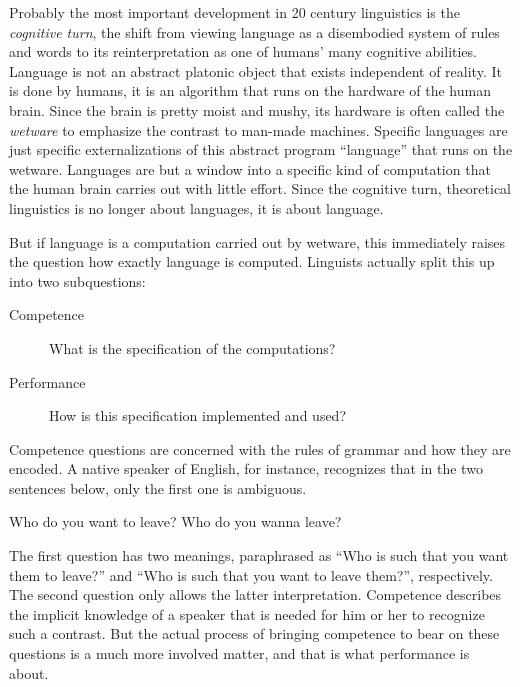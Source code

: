 Probably the most important development in 20 century linguistics is the \emph{cognitive turn}, the shift from viewing language as a disembodied system of rules and words to its reinterpretation as one of humans' many cognitive abilities.
Language is not an abstract platonic object that exists independent of reality.
It is done by humans, it is an algorithm that runs on the hardware of the human brain.
Since the brain is pretty moist and mushy, its hardware is often called the \emph{wetware} to emphasize the contrast to man-made machines.
Specific languages are just specific externalizations of this abstract program ``language'' that runs on the wetware.
Languages are but a window into a specific kind of computation that the human brain carries out with little effort.
Since the cognitive turn, theoretical linguistics is no longer about languages, it is about language.

But if language is a computation carried out by wetware, this immediately raises the question how exactly language is computed.
Linguists actually split this up into two subquestions:
%
\begin{description}
    \item[Competence]
        What is the specification of the computations?
    \item[Performance]
        How is this specification implemented and used?
\end{description}
%
Competence questions are concerned with the rules of grammar and how they are encoded.
A native speaker of English, for instance, recognizes that in the two sentences below, only the first one is ambiguous.
%
\begin{exe}
    \ex
    \begin{xlist}
        \ex Who do you want to leave?
        \ex Who do you wanna leave?
    \end{xlist}
\end{exe}
%
The first question has two meanings, paraphrased as ``Who is such that you want them to leave?'' and ``Who is such that you want to leave them?'', respectively.
The second question only allows the latter interpretation.
Competence describes the implicit knowledge of a speaker that is needed for him or her to recognize such a contrast.
But the actual process of bringing competence to bear on these questions is a much more involved matter, and that is what performance is about.

